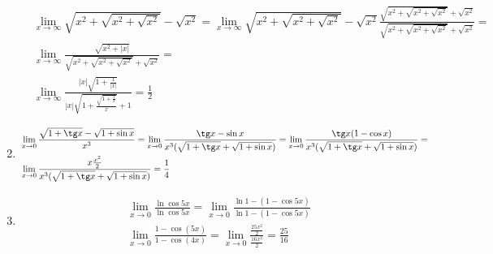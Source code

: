 \documentclass{article}
\begin{document}
\begin{enumerate}
    \begin{align*}
        & \lim\limits_{x \to \infty}{\sqrt{x^{2} + \sqrt{x^{2} + \sqrt{x^{2}}}} - \sqrt{x^{2}}} = 
         \lim\limits_{x \to \infty}{\sqrt{x^{2} + \sqrt{x^{2} + \sqrt{x^{2}}}} - \sqrt{x^{2}}} 
         \frac{{\sqrt{x^{2} + \sqrt{x^{2} + \sqrt{x^{2}}}} + \sqrt{x^{2}}}}
         {{\sqrt{x^{2} + \sqrt{x^{2} + \sqrt{x^{2}}}} + \sqrt{x^{2}}}} = \\
        & \lim\limits_{x \to \infty}{\frac{\sqrt{x^{2} + |x|}}{{\sqrt{x^{2} + \sqrt{x^{2} + \sqrt{x^{2}}}} + \sqrt{x^{2}}}}} = \\
        & \lim\limits_{x \to \infty}{\frac{|x| \sqrt{1 + \frac{1}{|x|}}}{
            |x|\sqrt{1 + \frac{\sqrt{1 + \frac{1}{x}}}{x}} + 1 
        }} = \frac{1}{2}
    \end{align*}
    \item 
    \begin{align*}
        & \lim\limits_{x \to 0}{\frac{\sqrt{1 + \tg x} - \sqrt{1 + \sin x}}{x^{3}}} = 
        \lim\limits_{x \to 0}{\frac{\tg x - \sin x}{x^{3}(\sqrt{1 + \tg x} + \sqrt{1 + \sin x})}}= 
        \lim\limits_{x \to 0}{\frac{\tg x (1 - \cos x)}{x^{3}(\sqrt{1 + \tg x} + \sqrt{1 + \sin x})}} =  \\
        & \lim\limits_{x \to 0}{\frac{x \frac{x^{2}}{2}}{x^{3}(\sqrt{1 + \tg x} + \sqrt{1 + \sin x})}} = \frac{1}{4}
    \end{align*}
    \item 
    \begin{align*}
        & \lim\limits_{x \to 0}{\frac{\ln{\cos{5x}}}{\ln\cos{5x}}} = 
        \lim\limits_{x \to 0}{\frac{\ln{1 - (1 - \cos{5x})}}{\ln{1 - (1 - \cos{5x})}}} \\
        & \lim\limits_{x \to 0}{\frac{1 - \cos (5x)}{1 - \cos (4x)}} = 
         \lim\limits_{x \to 0}{\frac{\frac{25 x^{2}}{2}}{\frac{16 x^{2}}{2}}} = \frac{25}{16}
    \end{align*}

\end{enumerate}
\end{document}
